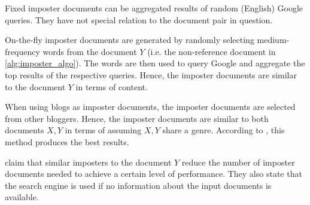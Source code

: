 Fixed imposter documents can be aggregated results of random (English) Google queries.
They have not special relation to the document pair in question.

On-the-fly imposter documents are generated by randomly selecting medium-frequency words from the document $Y$ (i.e. the non-reference document in \autoref{alg:imposter_algo}).
The words are then used to query Google and aggregate the top results of the respective queries. 
Hence, the imposter documents are similar to the document $Y$ in terms of content.

When using blogs as imposter documents, the imposter documents are selected from other bloggers. 
Hence, the imposter documents are similar to both documents $X,Y$ in terms of assuming $X,Y$ share a genre.
According to \citet{koppel_determining_2014}, this method produces the best results.

\citet{koppel_determining_2014} claim that similar imposters to the document $Y$ reduce the number of imposter documents needed to achieve a certain level of performance.
They also state that the search engine is used if no information about the input documents is available.